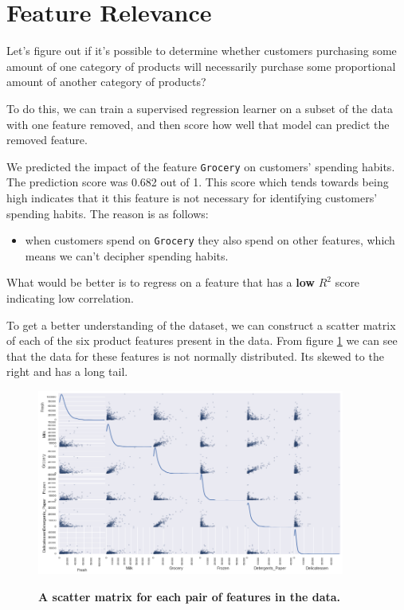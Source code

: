 \documentclass[twoside,openright,titlepage,numbers=noenddot,headinclude,%
               footinclude=true,cleardoublepage=empty,abstractoff,BCOR=5mm,%
               paper=a4,fontsize=11pt,ngerman,american]{scrreprt}
\numberwithin{theorem}{chapter}
\numberwithin{definition}{chapter}
\numberwithin{algorithm}{chapter}
\numberwithin{figure}{chapter}
\numberwithin{table}{chapter}
\numberwithin{equation}{chapter}
\begin{document}
\section*{Feature Relevance}
Let's figure out if it's possible to determine whether customers purchasing some amount of one category of products will necessarily purchase some proportional amount of another category of products? 

To do this, we can train a supervised regression learner on a subset of the data with one feature removed, and then score how well that model can predict the removed feature.

We predicted the impact of the feature \texttt{Grocery} on customers' spending habits. The prediction score was 0.682 out of 1. This score which tends towards being high indicates that it this feature is not necessary for identifying customers' spending habits. The reason is as follows: 
\begin {itemize}
\item when customers spend on \texttt{Grocery} they also spend on other features, which means we can't decipher spending habits. 
\end{itemize}
What would be better is to regress on a feature that has a \textbf{low} $R^2$ score indicating low correlation.


To get a better understanding of the dataset, we can construct a scatter matrix of each of the six product features present in the data. From figure \ref{scatterplot} we can see that the data for these features is not normally distributed. Its skewed to the right and has a long tail.
\begin{figure}[!hbtp]
\centering
   
    \includegraphics[width=0.9\textwidth]{figures/scatterplot}
    \label{scatterplot}
    
    \caption{\textbf{A scatter matrix for each pair of features in the data. }}
\end{figure}
\end{document}
